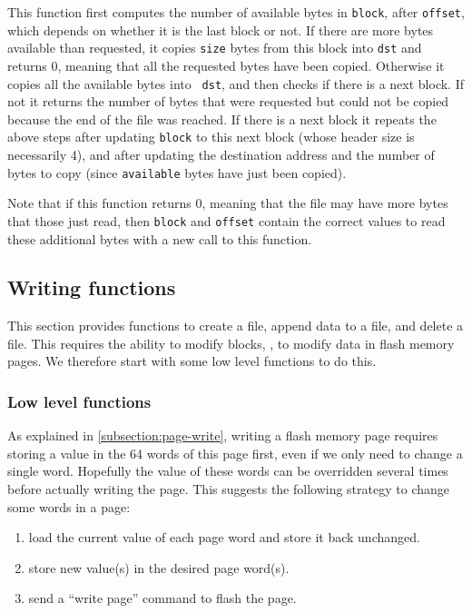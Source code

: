 This function first computes the number of available bytes in {\tt *block},
after {\tt *offset}, which depends on whether it is the last block or not. If
there are more bytes available than requested, it copies {\tt size} bytes from
this block into {\tt dst} and returns 0, meaning that all the requested
bytes have been copied. Otherwise it copies all the available bytes into {\tt
dst}, and then checks if there is a next block. If not it returns the number
of bytes that were requested but could not be copied because the end of the
file was reached. If there is a next block it repeats the above steps after
updating {\tt *block} to this next block (whose header size is necessarily 4),
and after updating the destination address and the number of bytes to copy
(since {\tt available} bytes have just been copied).

Note that if this function returns 0, meaning that the file may have more
bytes that those just read, then {\tt *block} and {\tt *offset} contain
the correct values to read these additional bytes with a new call to this
function.

\subsection{Writing functions}

This section provides functions to create a file, append data to a file, and
delete a file. This requires the ability to modify blocks, \ie, to modify data
in flash memory pages. We therefore start with some low level functions to do
this.

\subsubsection{Low level functions}

As explained in \cref{subsection:page-write}, writing a flash memory page
requires storing a value in the 64 words of this page first, even if we only
need to change a single word. Hopefully the value of these words can be
overridden several times before actually writing the page. This suggests the
following strategy to change some words in a page:
\begin{enumerate}
  \item load the current value of each page word and store it back unchanged.
  \item store new value(s) in the desired page word(s).
  \item send a ``write page'' command to flash the page.
\end{enumerate}

